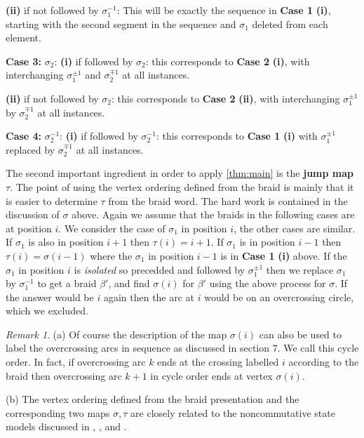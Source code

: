 \documentclass[11pt]{article}
\theoremstyle{definition}
\theoremstyle{remark}
\newtheorem*{rem}{Remark}
\theoremstyle{remark}
\begin{document}
\noindent \textbf{(ii)} if not followed by $\sigma_1^{-1}$: This will be exactly the sequence in \textbf{Case 1} \textbf{(i)}, starting with the second segment in the sequence and $\sigma_1$ deleted from each element. 

\vskip 0.1in

\noindent \textbf{Case 3:} $\sigma_2$: \textbf{(i)} if followed by $\sigma_2$: this corresponds to \textbf{Case 2} \textbf{(i)}, with interchanging $\sigma_1^{\pm 1}$ and $\sigma_2^{\mp 1}$ at all instances.

\noindent \textbf{(ii)} if not followed by $\sigma_2$: this corresponds to \textbf{Case 2} \textbf{(ii)}, with interchanging $\sigma_1^{\pm 1}$ by $\sigma_2^{\mp 1}$ at all instances.

\vskip 0.1in

\noindent \textbf{Case 4:} $\sigma_2^{-1}$: \textbf{(i)} if followed by $\sigma_2^{-1}$: this corresponds to \textbf{Case 1} \textbf{(i)} with $\sigma_1^{\pm 1}$ replaced by $\sigma_2^{\mp 1}$ at all instances.  

\vskip 0.2in

The second important ingredient in order to apply \ref{thm:main} is the \textbf{jump map} $\tau $. The point of using the vertex ordering defined from the braid is mainly that it is easier to determine $\tau $ from the braid word. The hard work is contained in the discussion of $\sigma $ above. Again we assume that the braids in the following cases are at position $i$. We consider the case of $\sigma_1$ in position $i$, the other cases are similar. If $\sigma_1$ is also in position $i+1$ then $\tau (i)=i+1$. If $\sigma_1$ is in position $i-1$ then $\tau (i)=\sigma (i-1)$ where the $\sigma_1$ in position $i-1$ is in \textbf{Case 1} \textbf{(i)} above. If the $\sigma_1$ in position $i$ is \textit{isolated} so precedded and followed by $\sigma_1^{\pm 1}$ then we replace $\sigma_1$ by $\sigma_1^{-1}$ to get a braid $\beta '$, and find $\sigma (i)$ for $\beta '$ using the above process for $\sigma $. If the answer would be $i$ again then the arc at $i$ would be on an overcrossing circle, which we excluded. 

\begin{rem} (a) Of course the description of the map $\sigma (i)$ can also be used to label the overcrossing arcs in sequence 
as discussed in section 7. We call this cycle order. In fact, if overcrossing arc $k$ ends at the crossing labelled $i$ according to the braid then overcrossing arc $k+1$ in cycle order ends at vertex $\sigma (i)$. 

\noindent (b) The vertex ordering defined from the braid presentation and the corresponding two maps $\sigma ,\tau $ are closely related to the noncommutative state models discussed in \cite{A}, \cite{GL}, \cite{H} and \cite{B}. 
\end{rem}
\end{document}
